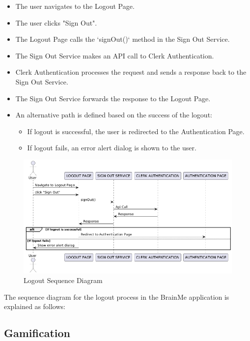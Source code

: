 \begin{itemize}
    \item The user navigates to the Logout Page.
    \item The user clicks "Sign Out".
    \item The Logout Page calls the `signOut()` method in the Sign Out Service.
    \item The Sign Out Service makes an API call to Clerk Authentication.
    \item Clerk Authentication processes the request and sends a response back to the Sign Out Service.
    \item The Sign Out Service forwards the response to the Logout Page.
    \item An alternative path is defined based on the success of the logout:
    \begin{itemize}
        \item If logout is successful, the user is redirected to the Authentication Page.
        \item If logout fails, an error alert dialog is shown to the user.
    \end{itemize}
\end{itemize}

\begin{figure}[H]
    \centering
    \includegraphics[width=1\linewidth, height=0.5\textheight]{Sequence Diagrams/logout.png}
    \caption{Logout Sequence Diagram}
\end{figure}

The sequence diagram for the logout process in the BrainMe application is explained as follows:



\subsection{Gamification}

